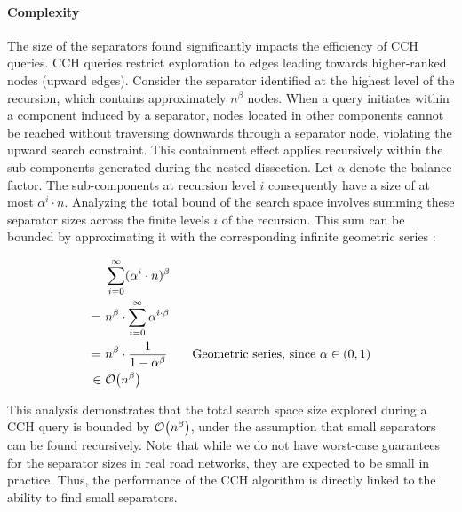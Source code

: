 \paragraph{Complexity}

The size of the separators found significantly impacts the efficiency of CCH queries.
CCH queries restrict exploration to edges leading towards higher-ranked nodes (upward edges).
Consider the separator identified at the highest level of the recursion, which contains approximately \(n^\beta\) nodes.
When a query initiates within a component induced by a separator, nodes located in other components cannot be reached without traversing downwards through a separator node, violating the upward search constraint.
This containment effect applies recursively within the sub-components generated during the nested dissection.
Let \(\alpha\) denote the balance factor.
The sub-components at recursion level \(i\) consequently have a size of at most \( \alpha^i \cdot n \).
Analyzing the total bound of the search space involves summing these separator sizes across the finite levels \(i\) of the recursion.
This sum can be bounded by approximating it with the corresponding infinite geometric series \cite{bauer_search-space_2016}:

\begin{align*}
	    & ~\sum_{i=0}^{\infty} (\alpha^i\cdot n)^\beta                                                         \\
	=   & ~n^\beta \cdot \sum_{i=0}^{\infty} \alpha^{i\cdot \beta}                                             \\
	=   & ~n^\beta \cdot \frac{1}{1 - \alpha^\beta} \qquad \text{Geometric series, since \(\alpha \in (0,1)\)} \\
	\in & ~\mathcal{O}\!\left(n^\beta\right)
\end{align*}

This analysis demonstrates that the total search space size explored during a CCH query is bounded by \(\mathcal{O}\!\left(n^\beta\right)\), under the assumption that small separators can be found recursively.
Note that while we do not have worst-case guarantees for the separator sizes in real road networks, they are expected to be small in practice.
Thus, the performance of the CCH algorithm is directly linked to the ability to find small separators.
